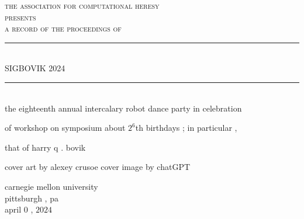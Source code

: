 \documentclass{article}
\begin{document}
\setmainfont{Splotch.ttf}
\setsansfont{Birbaslo.ttf}

\newcommand{\HRule}{\rule{\linewidth}{0.5mm}}

\begin{titlepage}
\begin{center}

\textsc{\LARGE the association for computational heresy}\\[0.5cm]

\textsc{\large presents}\\[1cm]

\textsc{\Large a record of the proceedings of}\\[0.5cm]
\HRule \\[0.4cm]
{ \Huge \sf SIGBOVIK 2024 \\[0.4cm] }
\HRule \\[2cm]


the eighteenth annual intercalary robot dance party in celebration

of workshop on symposium about $2^6$th birthdays{ ;} in particular{ ,}

that of harry q{ .} bovik


\vfill

cover art by alexey crusoe
cover image by chatGPT

\vfill

{\Large carnegie mellon university\\[0.25cm]
pittsburgh{ ,} pa\\[0.3cm]
april $0${ ,} $2024$}

\end{center}
\end{titlepage}
\end{document}
